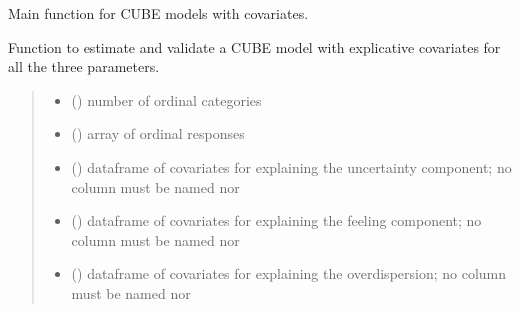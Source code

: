 \documentclass[letterpaper,10pt,english]{sphinxmanual}
\begin{document}
\begin{fulllineitems}
\label{\detokenize{cubmods:cubmods.cube_ywz.mle}}
\pysigstartsignatures
{}
\pysigstopsignatures
\sphinxAtStartPar
Main function for CUBE models with covariates.

\sphinxAtStartPar
Function to estimate and validate a CUBE model with 
explicative covariates for all the three parameters.
\begin{quote}\begin{description}
\begin{itemize}
\item {} 
\sphinxAtStartPar
{} () \textendash{} number of ordinal categories

\item {} 
\sphinxAtStartPar
{} () \textendash{} array of ordinal responses

\item {} 
\sphinxAtStartPar
{} () \textendash{} dataframe of covariates for explaining the uncertainty component;
no column must be named  nor 

\item {} 
\sphinxAtStartPar
{} () \textendash{} dataframe of covariates for explaining the feeling component;
no column must be named  nor 

\item {} 
\sphinxAtStartPar
{} () \textendash{} dataframe of covariates for explaining the overdispersion;
no column must be named  nor 


\end{itemize}
\end{description}
\end{quote}
\end{fulllineitems}
\end{document}
